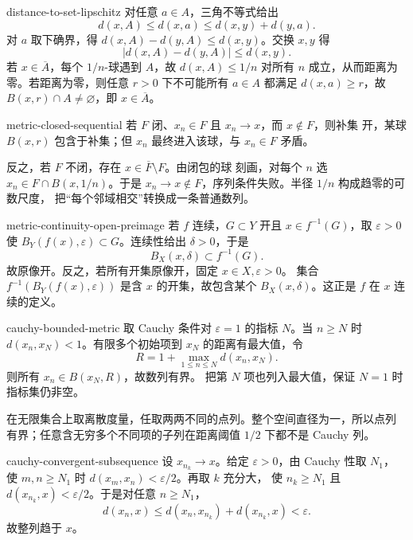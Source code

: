 \begin{solution}{distance-to-set-lipschitz}
对任意 \(a\in A\)，三角不等式给出
\[
 d(x,A)\le d(x,a)\le d(x,y)+d(y,a).
\]
对 \(a\) 取下确界，得
\(d(x,A)-d(y,A)\le d(x,y)\)。交换 \(x,y\) 得
\[
 |d(x,A)-d(y,A)|\le d(x,y).
\]
若 \(x\in\overline A\)，每个 \(1/n\)-球遇到 \(A\)，故
\(d(x,A)\le1/n\) 对所有 \(n\) 成立，从而距离为零。若距离为零，则任意
\(r>0\) 下不可能所有 \(a\in A\) 都满足 \(d(x,a)\ge r\)，故
\(B(x,r)\cap A\ne\varnothing\)，即 \(x\in\overline A\)。
\end{solution}

\begin{solution}{metric-closed-sequential}
若 \(F\) 闭、\(x_n\in F\) 且 \(x_n\to x\)，而 \(x\notin F\)，则补集
开，某球 \(B(x,r)\) 包含于补集；但 \(x_n\) 最终进入该球，与
\(x_n\in F\) 矛盾。

反之，若 \(F\) 不闭，存在 \(x\in\overline F\setminus F\)。由闭包的球
刻画，对每个 \(n\) 选 \(x_n\in F\cap B(x,1/n)\)。于是
\(x_n\to x\notin F\)，序列条件失败。半径 \(1/n\) 构成趋零的可数尺度，
把“每个邻域相交”转换成一条普通数列。
\end{solution}

\begin{solution}{metric-continuity-open-preimage}
若 \(f\) 连续，\(G\subset Y\) 开且 \(x\in f^{-1}(G)\)，取
\(\varepsilon>0\) 使 \(B_Y(f(x),\varepsilon)\subset G\)。连续性给出
\(\delta>0\)，于是
\[
 B_X(x,\delta)\subset f^{-1}(G).
\]
故原像开。反之，若所有开集原像开，固定 \(x\in X,\varepsilon>0\)。
集合 \(f^{-1}(B_Y(f(x),\varepsilon))\) 是含 \(x\) 的开集，故包含某个
\(B_X(x,\delta)\)。这正是 \(f\) 在 \(x\) 连续的定义。
\end{solution}

\begin{solution}{cauchy-bounded-metric}
取 Cauchy 条件对 \(\varepsilon=1\) 的指标 \(N\)。当 \(n\ge N\) 时
\(d(x_n,x_N)<1\)。有限多个初始项到 \(x_N\) 的距离有最大值，令
\[
 R=1+\max_{1\le n\le N}d(x_n,x_N).
\]
则所有 \(x_n\in B(x_N,R)\)，故数列有界。
把第 \(N\) 项也列入最大值，保证 \(N=1\) 时指标集仍非空。

在无限集合上取离散度量，任取两两不同的点列。整个空间直径为一，所以点列
有界；任意含无穷多个不同项的子列在距离阈值 \(1/2\) 下都不是 Cauchy 列。
\end{solution}

\begin{solution}{cauchy-convergent-subsequence}
设 \(x_{n_k}\to x\)。给定 \(\varepsilon>0\)，由 Cauchy 性取 \(N_1\)，
使 \(m,n\ge N_1\) 时 \(d(x_m,x_n)<\varepsilon/2\)。再取 \(k\) 充分大，
使 \(n_k\ge N_1\) 且 \(d(x_{n_k},x)<\varepsilon/2\)。于是对任意
\(n\ge N_1\)，
\[
 d(x_n,x)\le d(x_n,x_{n_k})+d(x_{n_k},x)<\varepsilon.
\]
故整列趋于 \(x\)。
\end{solution}

